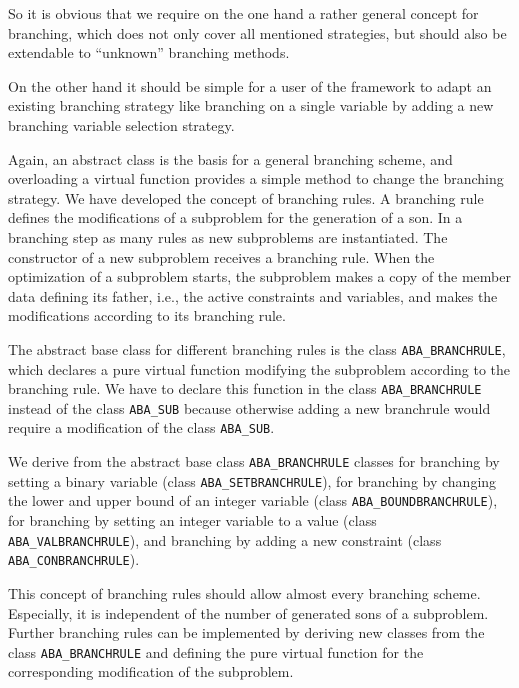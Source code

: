So it is obvious that we require on the one hand a rather general concept for
branching, which does not only cover all mentioned strategies,
but should also be extendable to ``unknown'' branching methods.

On the other hand it should be simple for a user of the framework
to adapt an existing branching strategy like branching
on a single variable by adding a new branching variable selection
strategy.

Again, an abstract class is the basis for a general branching scheme,
and overloading a virtual function provides a simple method
to change the branching strategy.
We have developed the concept of branching rules.
A branching rule defines the modifications of a subproblem for the
generation of a son. In a branching step as many rules as new subproblems
are instantiated. The constructor of a new subproblem receives a branching
rule. When the optimization of a subproblem starts, the subproblem makes 
a copy of the member data defining its father, i.e., the active constraints
and variables, and makes the modifications
according to its branching rule.

The abstract base class for different branching rules is the class
{\tt ABA\_BRANCHRULE}, which declares
a pure virtual function 
modifying the subproblem according to the branching rule.
We have to declare this function in the class {\tt ABA\_BRANCHRULE} instead
of the class {\tt ABA\_SUB} because otherwise adding a new branchrule would
require a modification of the class {\tt ABA\_SUB}.

We derive from the abstract base
class {\tt ABA\_BRANCHRULE} classes for branching by setting a binary
variable (class {\tt ABA\_SETBRANCHRULE}), 
for branching by changing the lower and upper bound of an integer variable 
(class {\tt ABA\_BOUNDBRANCHRULE}), 
for
branching by setting an integer variable to a value
(class {\tt ABA\_VALBRANCHRULE}), 
and branching by adding a new constraint
(class {\tt ABA\_CONBRANCHRULE}).

This concept of branching rules should allow almost every branching scheme.
Especially, it is independent of the number of generated sons of 
a subproblem. Further branching rules can be implemented by deriving
new classes from the class {\tt ABA\_BRANCHRULE} and defining the pure virtual
function for the corresponding modification of the subproblem.

